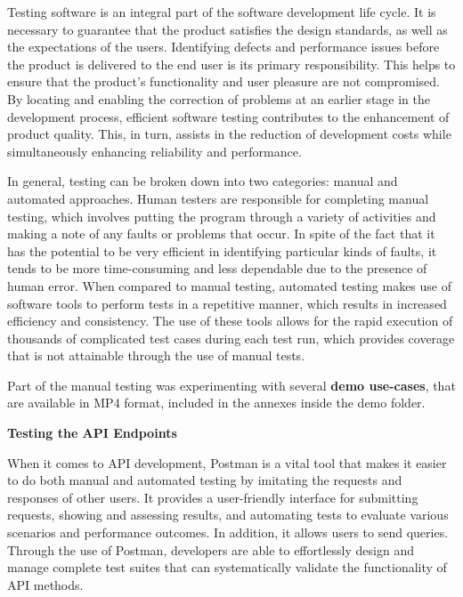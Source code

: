 Testing software is an integral part of the software development life cycle. It is necessary to guarantee that the product satisfies the design standards, as well as the expectations of the users. Identifying defects and performance issues before the product is delivered to the end user is its primary responsibility. This helps to ensure that the product's functionality and user pleasure are not compromised. By locating and enabling the correction of problems at an earlier stage in the development process, efficient software testing contributes to the enhancement of product quality. This, in turn, assists in the reduction of development costs while simultaneously enhancing reliability and performance. \cite{whatIsSoftwareTesting1}

In general, testing can be broken down into two categories: manual and automated approaches. Human testers are responsible for completing manual testing, which involves putting the program through a variety of activities and making a note of any faults or problems that occur. In spite of the fact that it has the potential to be very efficient in identifying particular kinds of faults, it tends to be more time-consuming and less dependable due to the presence of human error. When compared to manual testing, automated testing makes use of software tools to perform tests in a repetitive manner, which results in increased efficiency and consistency. The use of these tools allows for the rapid execution of thousands of complicated test cases during each test run, which provides coverage that is not attainable through the use of manual tests. \cite{whatIsSoftwareTesting2}

Part of the manual testing was experimenting with several \textbf{demo use-cases}, that are available in MP4 format, included in the annexes inside the demo folder.

\noindent\textbf{Testing the API Endpoints}

When it comes to API development, Postman is a vital tool that makes it easier to do both manual and automated testing by imitating the requests and responses of other users. It provides a user-friendly interface for submitting requests, showing and assessing results, and automating tests to evaluate various scenarios and performance outcomes. In addition, it allows users to send queries. Through the use of Postman, developers are able to effortlessly design and manage complete test suites that can systematically validate the functionality of API methods. \cite{postman}


